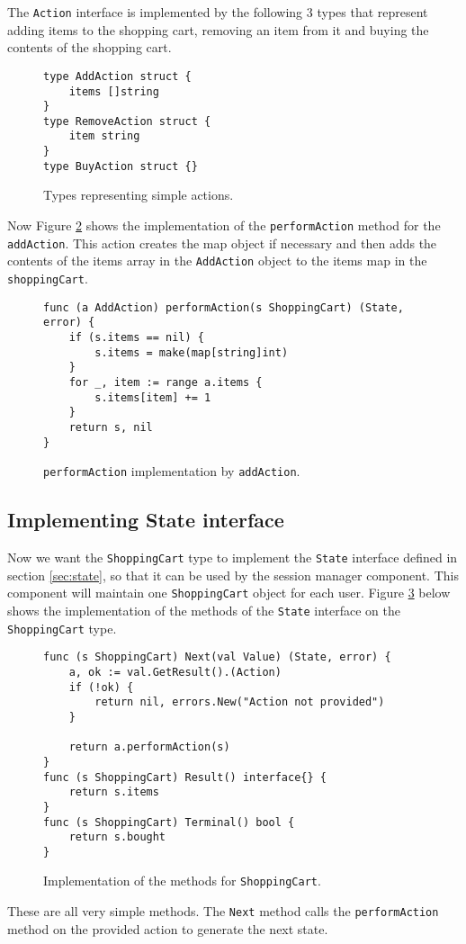 The \texttt{Action} interface is implemented by the following 3 types
that represent adding items to the shopping cart, removing an item from it
and buying the contents of the shopping cart.
\begin{figure}[h]
\begin{lstlisting}
type AddAction struct {
    items []string
}
type RemoveAction struct {
    item string
}
type BuyAction struct {}
\end{lstlisting}
\caption[scale=1.0]{Types representing simple actions.}
\label{fig:actions}
\end{figure}

Now Figure \ref{fig:addAction} shows the implementation of the \texttt{performAction}
method for the \texttt{addAction}. This action creates the map object if 
necessary and then adds the contents of the items array in the \texttt{AddAction}
object to the items map in the \texttt{shoppingCart}.
\begin{figure}[h]
\begin{lstlisting}
func (a AddAction) performAction(s ShoppingCart) (State, error) {
    if (s.items == nil) {
        s.items = make(map[string]int)
    }
    for _, item := range a.items {
        s.items[item] += 1
    }
    return s, nil
}
\end{lstlisting}
\caption[scale=1.0]{\texttt{performAction} implementation by \texttt{addAction}.}
\label{fig:addAction}
\end{figure}

\subsection{Implementing State interface}
Now we want the \texttt{ShoppingCart} type to implement the \texttt{State} 
interface defined in section
\ref{sec:state}, so that it can be used by the session manager component.
This component will maintain one \texttt{ShoppingCart} object for each user.
Figure \ref{fig:shoppingCartImpl} below shows the implementation of the 
methods of the \texttt{State} interface on the \texttt{ShoppingCart} type.
\begin{figure}[h]
\begin{lstlisting}
func (s ShoppingCart) Next(val Value) (State, error) {
    a, ok := val.GetResult().(Action)
    if (!ok) {
        return nil, errors.New("Action not provided")
    }

    return a.performAction(s)
}
func (s ShoppingCart) Result() interface{} {
    return s.items
}
func (s ShoppingCart) Terminal() bool {
    return s.bought
}
\end{lstlisting}
\caption[scale=1.0]{Implementation of the methods for \texttt{ShoppingCart}.}
\label{fig:shoppingCartImpl}
\end{figure}
These are all very simple methods. The \texttt{Next} method calls 
the \texttt{performAction} method on the provided action to generate 
the next state.

